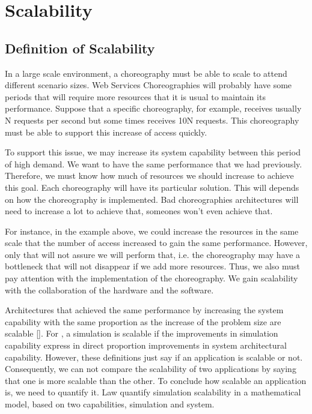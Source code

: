 \section{Scalability}

\subsection{Definition of Scalability}
In a large scale environment, a choreography must be able to scale to attend different scenario sizes. Web Services Choreographies will probably have some periods that will require more resources that it is usual to maintain its performance.  Suppose that a specific choreography, for example, receives usually N requests per second but some times receives 10N requests. This choreography must be able to support this increase of access quickly.

To support this issue, we may increase its system capability between this period of high demand. We want to have the same performance that we had previously. Therefore, we must know how much of resources we should increase to achieve this goal.  Each choreography will have its particular solution. This will depends on how the choreography is implemented. Bad choreographies architectures will need to increase a lot to achieve that, someones won't even achieve that.

For instance, in the example above, we could increase the resources in the same scale that the number of access increased to gain the same performance. However, only that will not assure we will perform that, i.e.  the choreography may have a bottleneck that will not disappear if we add more resources. Thus, we also must pay attention with the implementation of the choreography. We gain scalability with the collaboration of the hardware and the software. 

Architectures that achieved the same performance by increasing the system capability with the same proportion as the increase of the problem size are scalable [\citet{QUINN}]. For \citet{LAW}, a simulation is scalable if the improvements in simulation capability express in direct proportion improvements in system architectural capability. However, these definitions just say if an application is scalable or not. Consequently, we can not compare the scalability of two applications by saying that one is more scalable than the other. To conclude how scalable an application is, we need to quantify it. Law quantify simulation scalability in a mathematical model, based on two capabilities, simulation and system.

